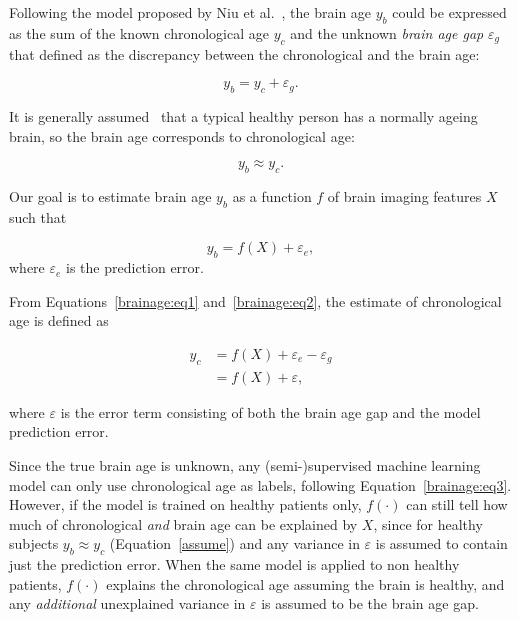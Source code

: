 Following the model proposed by Niu et al.~\cite{niu2019improved}, the brain age $y_b$ could be expressed as the sum of the known chronological age $y_c$ and the unknown \textit{brain age gap} $\varepsilon_g$ that defined as the discrepancy between the chronological and the brain age:

\begin{equation}
    \label{brainage:eq1}
    y_b = y_c + \varepsilon_g.
\end{equation}

It is generally assumed~\cite{franke2019ten} that a typical healthy person has a normally ageing brain, so the brain age corresponds to chronological age:

\begin{equation}
    \label{brainage:assume}
    y_b \approx y_c.
\end{equation}

Our goal is to estimate brain age $y_b$ as a function $f$ of brain imaging features $X$ such that

\begin{equation}
    \label{brainage:eq2}
    y_b = f(X) + \varepsilon_e,
\end{equation}
where $\varepsilon_e$ is the prediction error.

From Equations~\eqref{brainage:eq1} and~\eqref{brainage:eq2}, the estimate of chronological age is defined as

\begin{align}
    y_c &= f(X) + \varepsilon_e - \varepsilon_g \\
        \label{brainage:eq3}
        &= f(X) + \varepsilon,
\end{align}

where $\varepsilon$ is the error term consisting of both the brain age gap and the model prediction error.

Since the true brain age is unknown, any (semi-)supervised machine learning model can only use chronological age as labels, following Equation~\eqref{brainage:eq3}. However, if the model is trained on healthy patients only, $f(\cdot)$ can still tell how much of chronological \textit{and} brain age can be explained by $X$, since for healthy subjects $y_b \approx y_c$ (Equation~\eqref{assume}) and any variance in $\varepsilon$ is assumed to contain just the prediction error. When the same model is applied to non healthy patients, $f(\cdot)$ explains the chronological age assuming the brain is healthy, and any \textit{additional} unexplained variance in $\varepsilon$ is assumed to be the brain age gap.

